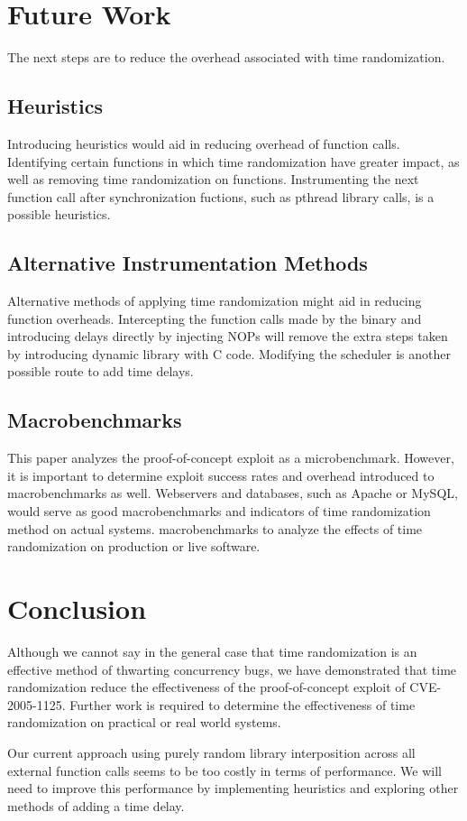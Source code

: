 \documentclass[letterpaper,twocolumn,10pt]{article}
\begin{document}
\section{Future Work}
The next steps are to reduce the overhead associated with time randomization.
\subsection{Heuristics}
Introducing heuristics would aid in reducing overhead of function calls.  Identifying certain functions in which time randomization have greater impact, as well as removing time randomization on functions. Instrumenting the next function call after synchronization fuctions, such as pthread library calls, is a possible heuristics.  
\subsection{Alternative Instrumentation Methods}
Alternative methods of applying time randomization might aid in reducing function overheads.  Intercepting the function calls made by the binary and introducing delays directly by injecting NOPs will remove the extra steps taken by introducing dynamic library with C code.  Modifying the scheduler is another possible route to add time delays.
\subsection{Macrobenchmarks}
This paper analyzes the proof-of-concept exploit as a microbenchmark. However, it is important to determine exploit success rates and overhead introduced to macrobenchmarks as well. Webservers and databases, such as Apache or MySQL, would serve as good macrobenchmarks and indicators of time randomization method on actual systems.
macrobenchmarks to analyze the effects of time randomization on production or live software.

\section{Conclusion}
Although we cannot say in the general case that time randomization is an effective method of thwarting concurrency bugs, we have demonstrated that time randomization reduce the effectiveness of the proof-of-concept exploit of CVE-2005-1125.  Further work is required to determine the effectiveness of time randomization on practical or real world systems.

Our current approach using purely random library interposition across all external function calls seems to be too costly in terms of performance.  We will need to improve this performance by implementing heuristics and exploring other methods of adding a time delay.
\end{document}
